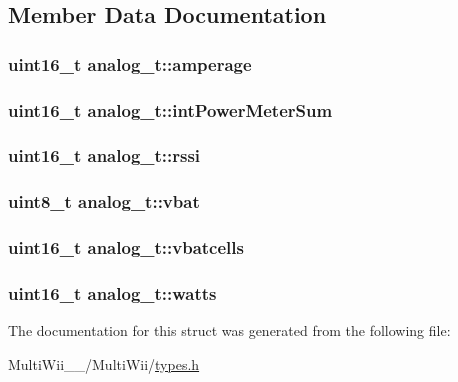 \subsection{Member Data Documentation}
\hypertarget{structanalog__t_ae71f1d51a99a36ca2d5d85a492d13e8c}{
\subsubsection[{amperage}]{\setlength{\rightskip}{0pt plus 5cm}uint16\-\_\-t analog\-\_\-t\-::amperage}}\label{structanalog__t_ae71f1d51a99a36ca2d5d85a492d13e8c}
\hypertarget{structanalog__t_ab3c586d0ea00744a3a2d0dd8f728a859}{
\subsubsection[{int\-Power\-Meter\-Sum}]{\setlength{\rightskip}{0pt plus 5cm}uint16\-\_\-t analog\-\_\-t\-::int\-Power\-Meter\-Sum}}\label{structanalog__t_ab3c586d0ea00744a3a2d0dd8f728a859}
\hypertarget{structanalog__t_a4e9074c00d8a5ab787ca9957163cef69}{
\subsubsection[{rssi}]{\setlength{\rightskip}{0pt plus 5cm}uint16\-\_\-t analog\-\_\-t\-::rssi}}\label{structanalog__t_a4e9074c00d8a5ab787ca9957163cef69}
\hypertarget{structanalog__t_a22cecf19aae154eaf1dd1830db749739}{
\subsubsection[{vbat}]{\setlength{\rightskip}{0pt plus 5cm}uint8\-\_\-t analog\-\_\-t\-::vbat}}\label{structanalog__t_a22cecf19aae154eaf1dd1830db749739}
\hypertarget{structanalog__t_a007631968079c7805e329c9d4356ac35}{
\subsubsection[{vbatcells}]{\setlength{\rightskip}{0pt plus 5cm}uint16\-\_\-t analog\-\_\-t\-::vbatcells}}\label{structanalog__t_a007631968079c7805e329c9d4356ac35}
\hypertarget{structanalog__t_a65857b84b3f0ca6fb9bccdc6ed605a68}{
\subsubsection[{watts}]{\setlength{\rightskip}{0pt plus 5cm}uint16\-\_\-t analog\-\_\-t\-::watts}}\label{structanalog__t_a65857b84b3f0ca6fb9bccdc6ed605a68}


The documentation for this struct was generated from the following file\-:\begin{DoxyCompactItemize}
\item 
Multi\-Wii\-\_\-\_/\-Multi\-Wii/\hyperlink{MultiWii__2__4_2MultiWii_2types_8h}{types.\-h}\end{DoxyCompactItemize}
